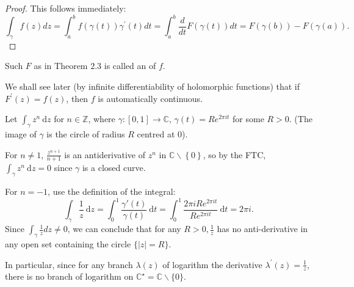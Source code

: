 \documentclass[a4paper]{scrartcl}
\begin{document}
\begin{proof}
     This follows immediately:
      \[
          \int_{\gamma} f(z) d z=\int_{a}^{b} f(\gamma(t)) \gamma^{\prime}(t) d t=\int_{a}^{b} \frac{d}{d t} F(\gamma(t)) d t=F(\gamma(b))-F(\gamma(a))
      .\] 
\end{proof}
\begin{remark}
     Such $F$ as in Theorem $2.3$ is called an  of $f$.
     
     We shall see later (by infinite differentiability of holomorphic functions) that if $F^{\prime}(z)=f(z)$, then $f$ is automatically continuous.
\end{remark}
\begin{example*}
      Let $\int_{\gamma}^{}z^{n} \ \mathrm{d}z $ for $n \in \mathbb{Z}$, where $\gamma: [0,1]\rightarrow \mathbb{C}$, $\gamma (t)=R e^{2\pi it}$ for some $R>0$. (The image of $\gamma$ is the circle of radius $R$ centred at 0). 

      For $n \neq 1$, $ \frac{z^{n+1}}{n+1}$ is an antiderivative of $z^{n}$ in $\mathbb{C}\backslash \left\{0\right\}$, so by the FTC, $\int_{\gamma}^{}z^{n} \ \mathrm{d}z =0$ since $\gamma$ is a closed curve.

      For $n=-1$, use the definition of the integral: \[
          \int_{\gamma}^{}\frac{1}{z} \ \mathrm{d}z =\int_{0}^{1} \frac{\gamma' (t)}{\gamma (t)} \ \mathrm{d}t=\int_{0}^{1} \frac{2 \pi iR e^{2\pi it}}{R e^{2\pi it}} \ \mathrm{d}t= 2 \pi i
      .\] 
      Since $\int_{\gamma} \frac{1}{z} d z \neq 0$, we can conclude that for any $R>0, \frac{1}{z}$ has no anti-derivative in any open set containing the circle $\{|z|=R\}$.

      In particular, since for any branch $\lambda(z)$ of logarithm the derivative $\lambda^{\prime}(z)=\frac{1}{z}$, there is no branch of logarithm on $\mathbb{C}^{\star}=\mathbb{C} \backslash\{0\} .$
\end{example*}
\begin{theorem}
      
\end{theorem}
\end{document}
